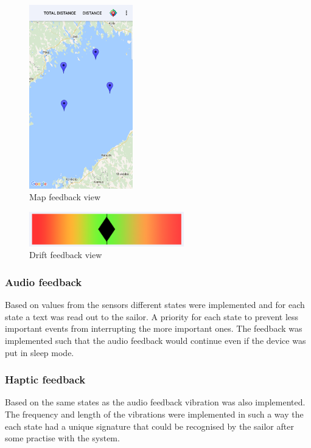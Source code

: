 \begin{figure}[H]
\centering
\includegraphics[width=0.4\textwidth]{Figures/map.png}
\caption{Map feedback view}
\label{feedback-map}
\end{figure}
\begin{figure}[H]
\centering
\includegraphics[width=0.6\textwidth]{Figures/drift.png}
\caption{Drift feedback view}
\label{feedback-drift}
\end{figure}

\subsubsection{Audio feedback}
Based on values from the sensors different states were implemented and for each state a text was read out to the sailor. A priority for each state to prevent less important events from interrupting the more important ones. The feedback was implemented such that the audio feedback would continue even if the device was put in sleep mode.

\subsubsection{Haptic feedback}
Based on the same states as the audio feedback vibration was also implemented. The frequency and length of the vibrations were implemented in such a way the each state had a unique signature that could be recognised by the sailor after some practise with the system.

